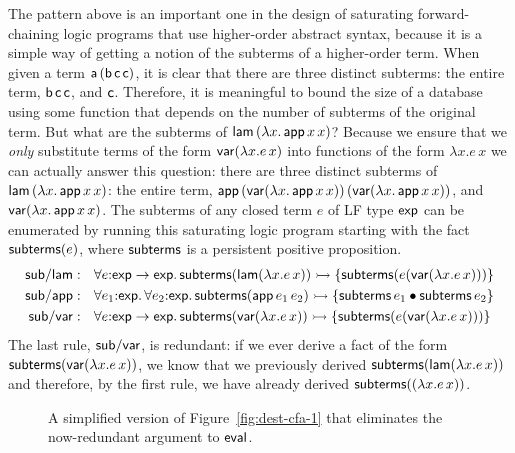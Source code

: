 The pattern above is an important one in the design of saturating
forward-chaining logic programs that use higher-order abstract syntax,
because it is a simple way of getting a notion of the subterms of a
higher-order term. When given a term ${\sf a}\,({\sf b}\,{\sf c}\,{\sf
  c})$, it is clear that there are three distinct subterms: the entire
term, ${\sf b}\,{\sf c}\,{\sf c}$, and ${\sf c}$. Therefore, it is
meaningful to bound the size of a database using some function that
depends on the number of subterms of the original term. But what are
the subterms of ${\sf lam}\,(\lambda x.\,{\sf app}\,x\,x)$?  Because
we ensure that we {\it only} substitute terms of the form ${\sf
  var}(\lambda x.e\,x)$ into functions of the form $\lambda x.e\,x$ we
can actually answer this question: there are three distinct subterms
of ${\sf lam}\,(\lambda x.\,{\sf app}\,x\,x)$: the entire term, ${\sf
  app}\,({\sf var}(\lambda x.\,{\sf app}\,x\,x))\,({\sf var}(\lambda
x.\,{\sf app}\,x\,x))$, and ${\sf var}(\lambda x.\,{\sf app}\,x\,x)$.
The subterms of any closed term $e$ of LF type ${\sf exp}$ can be enumerated
by running this saturating logic program starting with the fact 
${\sf subterms}(e)$, where ${\sf subterms}$ is a persistent positive 
proposition.
\begin{align*}
{\sf sub/lam} &: ~~
  \forall e{:}{\sf exp} \rightarrow {\sf exp}.\,
    {\sf subterms}({\sf lam}(\lambda x.e\,x)) \rightarrowtail
      \{ {\sf subterms}(e({\sf var}(\lambda x.e\,x))) \}
\\
{\sf sub/app} &: ~~
  \forall e_1{:}{\sf exp}.\, \forall e_2{:}{\sf exp}.\,
    {\sf subterms}({\sf app}\,e_1\,e_2) \rightarrowtail
      \{ {\sf subterms}\,e_1 \mathbin{\bullet} {\sf subterms}\,e_2 \}
\\
{\sf sub/var} &: ~~ 
  \forall e{:}{\sf exp} \rightarrow {\sf exp}.\,
    {\sf subterms}({\sf var}(\lambda x.e\,x)) \rightarrowtail
      \{ {\sf subterms}(e({\sf var}(\lambda x.e\,x))) \}
\end{align*}
The last rule, ${\sf sub/var}$, is redundant: if we ever derive a fact
of the form ${\sf subterms}({\sf var}(\lambda x.e\,x))$, we know that
we previously derived ${\sf subterms}({\sf lam}(\lambda x.e\,x))$ and
therefore, by the first rule, we have already derived ${\sf
  subterms}({\sf }(\lambda x.e\,x))$.

\begin{figure}
\caption{A simplified version of Figure~\ref{fig:dest-cfa-1} that
  eliminates the now-redundant argument to ${\sf eval}$.}
\label{fig:dest-cfa-2}
\end{figure}


